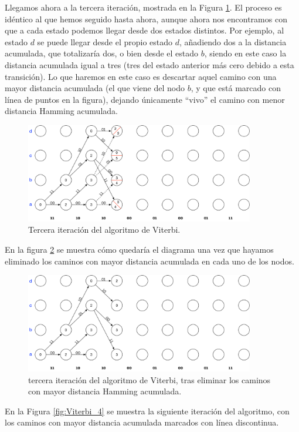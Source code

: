 \documentclass[es,apuntes]{uah}
\begin{document}
{Llegamos ahora a la tercera iteración, mostrada en la Figura \ref{fig:Viterbi_2}. El proceso es idéntico al que hemos seguido hasta ahora, aunque ahora nos encontramos con que a cada estado podemos llegar desde dos estados distintos. Por ejemplo, al estado $d$ se puede llegar desde el propio estado $d$, añadiendo dos a la distancia acumulada, que totalizaría dos, o bien desde el estado $b$, siendo en este caso la distancia acumulada igual a tres (tres del estado anterior más cero debido a esta transición). Lo que haremos en este caso es descartar aquel camino con una mayor distancia acumulada (el que viene del nodo $b$, y que está marcado con línea de puntos en la figura), dejando únicamente ``vivo'' el camino con menor distancia Hamming acumulada. 


\begin{figure}
	\centering\includegraphics[width=10cm]{./Figuras/Viterbi_2}
		\caption{Tercera iteración del algoritmo de Viterbi.}	
		\label{fig:Viterbi_2}
\end{figure}

En la figura \ref{fig:Viterbi_3} se muestra cómo quedaría el diagrama una vez que hayamos eliminado los caminos con mayor distancia acumulada en cada uno de los nodos. 

\begin{figure}
	\centering\includegraphics[width=10cm]{./Figuras/Viterbi_3}
		\caption{tercera iteración del algoritmo de Viterbi, tras eliminar los caminos con mayor distancia Hamming acumulada.}	
		\label{fig:Viterbi_3}
\end{figure}


En la Figura \ref{fig:Viterbi_4} se muestra la siguiente iteración del algoritmo, con los caminos con mayor distancia acumulada marcados con línea discontinua. 

}
\end{document}
